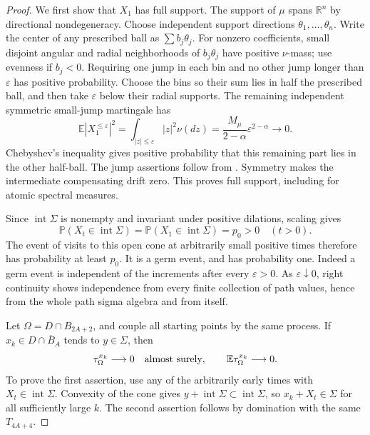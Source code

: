 \documentclass[11pt]{article}
\numberwithin{equation}{section}
\newcommand{\R}{\mathbb R}
\newcommand{\E}{\mathbb E}
\newcommand{\Prb}{\mathbb P}
\begin{document}
\begin{proof}
We first show that \(X_1\) has full support. The support of \(\mu\) spans
\(\R^n\) by directional nondegeneracy. Choose independent support
directions \(\theta_1,\ldots,\theta_n\). Write the center of any prescribed
ball as \(\sum b_j\theta_j\). For nonzero coefficients, small disjoint
angular and radial neighborhoods of \(b_j\theta_j\) have positive
\(\nu\)-mass; use evenness if \(b_j<0\). Requiring one jump in each bin
and no other jump longer than \(\varepsilon\) has positive probability.
Choose the bins so their sum lies in half the prescribed ball, and then
take \(\varepsilon\) below their radial supports. The remaining independent
symmetric small-jump martingale has
\[
 \E|X_1^{\le\varepsilon}|^2
 =\int_{|z|\le\varepsilon}|z|^2\nu(dz)
 =\frac{M_\mu}{2-\alpha}\varepsilon^{2-\alpha}\longrightarrow0.
\]
Chebyshev's inequality gives positive probability that this remaining part
lies in the other half-ball. The jump assertions follow from
\cite[Theorems 9.7, 9.9, 9.12 and Corollary 9.11]{S}.
Symmetry makes the intermediate compensating drift zero. This proves full
support, including for atomic spectral measures.

Since \(\operatorname{int}\Sigma\) is nonempty and invariant under positive
dilations, scaling gives
\[
 \Prb(X_t\in\operatorname{int}\Sigma)
       =\Prb(X_1\in\operatorname{int}\Sigma)=p_0>0\quad(t>0).
\]
The event of visits to this open cone at arbitrarily small positive times
therefore has probability at least \(p_0\). It is a germ event, and has
probability one. Indeed a germ event is independent of the increments after
every \(\varepsilon>0\). As \(\varepsilon\downarrow0\), right continuity
shows independence from every finite collection of path values, hence from
the whole path sigma algebra and from itself.

Let \(\Omega=D\cap B_{2A+2}\), and couple all starting points by the same
process. If \(x_k\in D\cap\overline B_A\) tends to \(y\in\Sigma\), then
\begin{equation}\label{eq:exit-small}
 \tau_\Omega^{x_k}\longrightarrow0\quad\hbox{almost surely},
 \qquad \E\tau_\Omega^{x_k}\longrightarrow0.
\end{equation}
To prove the first assertion, use any of the arbitrarily early times with
\(X_t\in\operatorname{int}\Sigma\). Convexity of the cone gives
\(y+\operatorname{int}\Sigma\subset\operatorname{int}\Sigma\), so
\(x_k+X_t\in\Sigma\) for all sufficiently large \(k\). The second
assertion follows by domination with the same \(T_{4A+4}\).


\end{proof}
\end{document}
